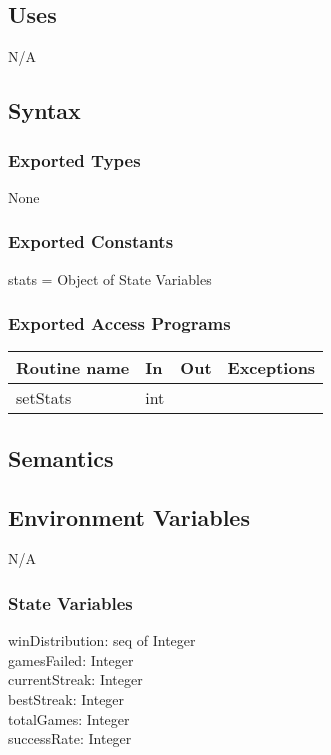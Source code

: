\documentclass[12pt]{article}
\begin{document}
\subsection* {Uses}

N/A

\subsection* {Syntax}

\subsubsection* {Exported Types}

None

\subsubsection* {Exported Constants}

stats = Object of State Variables

\subsubsection* {Exported Access Programs}

\begin{tabular}{| l | l | l | p{6cm} |}
\hline
\textbf{Routine name} & \textbf{In} & \textbf{Out} & \textbf{Exceptions}\\
\hline
setStats & int & ~ &  \\
\hline
\end{tabular}

\subsection* {Semantics}

\subsection*{Environment Variables}

N/A

\subsubsection* {State Variables}

winDistribution: seq of Integer\\
gamesFailed: Integer\\
currentStreak: Integer\\
bestStreak: Integer\\
totalGames: Integer\\
successRate: Integer
\end{document}
